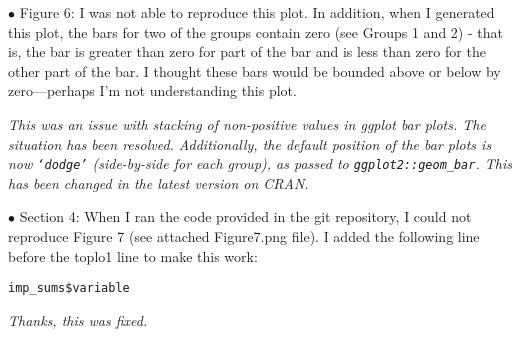 \documentclass[letterpaper,12pt]{article}
\begin{document}
$\bullet$ Figure 6:  I was not able to reproduce this plot.  In addition, when I generated this plot, the bars for two of the groups contain zero (see Groups 1 and 2) - that is, the bar is greater than zero for part of the bar and is less than zero for the other part of the bar.   I thought these bars would be bounded above or below by zero—perhaps I'm not understanding this plot.

{\it This was an issue with stacking of non-positive values in ggplot bar plots.  The situation has been resolved.  Additionally, the default position of the bar plots is now \texttt{`dodge'} (side-by-side for each group), as passed to \texttt{ggplot2::geom\_bar}.  This has been changed in the latest version on CRAN.}

$\bullet$ Section 4:  When I ran the code provided in the git repository, I could not reproduce Figure 7 (see attached Figure7.png file).  I added the following line before the toplo1 line to make this work:

\texttt{imp\_sums\$variable}

{\it Thanks, this was fixed.}
\end{document}
